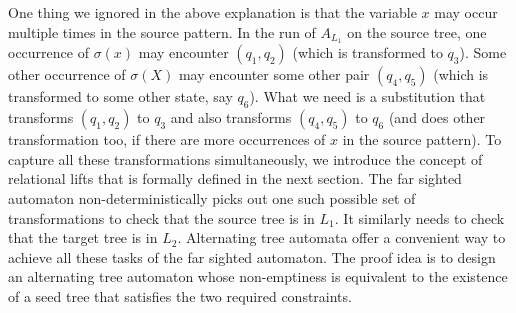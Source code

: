 One thing we ignored in the above explanation is that the variable $x$
may occur multiple times in the source pattern. In the run of
$A_{L_{1}}$ on the source tree, one occurrence of $\sigma(x)$ may
encounter $(q_1,q_2)$ (which is transformed to $q_3$). Some other
occurrence of $\sigma(X)$ may encounter some other pair $(q_4,q_5)$
(which is transformed to some other state, say $q_6$). What we need is
a substitution that transforms $(q_1,q_2)$ to $q_3$ and also
transforms $(q_4,q_5)$ to $q_6$ (and does other transformation too, if
there are more occurrences of $x$ in the source pattern). To capture
all these transformations simultaneously, we introduce the concept of relational lifts that is formally defined
in the next section. The far sighted automaton non-deterministically
picks out one such possible set of transformations to check that the
source tree is in $L_{1}$. It similarly needs to check that the target
tree is in $L_{2}$. Alternating tree automata offer a convenient way
to achieve all these tasks of the far sighted automaton. The proof
idea is to design an alternating tree automaton whose non-emptiness is
equivalent to the existence of a seed tree that satisfies the two
required constraints.
